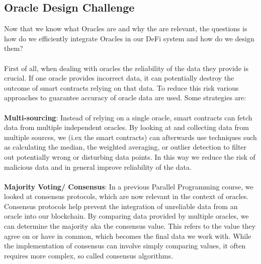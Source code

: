 \documentclass{article}
\begin{document}
\subsection{Oracle Design Challenge}
Now that we know what Oracles are and why the are relevant, the questions is how do we efficiently integrate Oracles in our DeFi system and how do we design them?\\
\\
First of all, when dealing with oracles the reliability of the data they provide is crucial. If one oracle provides incorrect data, it can potentially destroy the outcome of smart contracts relying on that data. To reduce this risk various approaches to guarantee accuracy of oracle data are used. Some strategies are:\\
\\
\textbf{Multi-sourcing}: Instead of relying on a single oracle, smart contracts can fetch data from multiple independent oracles. By looking at and collecting data from multiple sources, we (i.ex the smart contracts) can afterwards use techniques such as calculating the median, the weighted averaging, or outlier detection to filter out potentially wrong or disturbing data points. In this way we reduce the risk of malicious data  and in general improve reliability of the data.\\
\\
\textbf{Majority Voting/ Consensus}: In a previous Parallel Programming course, we looked at consensus protocols, which are now relevant in the context of oracles. Consensus protocols help prevent the integration of unreliable data from an oracle into our blockchain. By comparing data provided by multiple oracles, we can determine the majority aka the consensus value. This refers to the  value they agree on or have in common, which becomes the final data we work with. While the implementation of consensus can involve simply comparing values, it often requires more complex, so called consensus algorithms.
\end{document}
